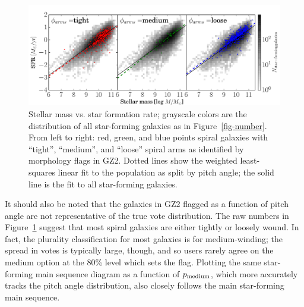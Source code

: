\documentclass{emulateapj}
\begin{document}
\begin{figure}
\includegraphics[angle=0,width=7.0in]{figures/ms_arms_winding.pdf}
\caption{Stellar mass vs. star formation rate; grayscale colors are the distribution of all star-forming galaxies as in Figure~\ref{fig-number}. From left to right: red, green, and blue points spiral galaxies with ``tight'', ``medium'', and ``loose'' spiral arms as identified by morphology flags in GZ2. Dotted lines show the weighted least-squares linear fit to the population as split by pitch angle; the solid line is the fit to all star-forming galaxies. 
\label{fig-winding}}
\end{figure}

It should also be noted that the galaxies in GZ2 flagged as a function of pitch angle are not representative of the true vote distribution. The raw numbers in Figure~\ref{fig-winding} suggest that most spiral galaxies are either tightly or loosely wound. In fact, the plurality classification for most galaxies is for medium-winding; the spread in votes is typically large, though, and so users rarely agree on the medium option at the 80\% level which sets the flag. Plotting the same star-forming main sequence diagram as a function of $p_{\rm medium}$, which more accurately tracks the pitch angle distribution, also closely follows the main star-forming main sequence. %
\end{document}

